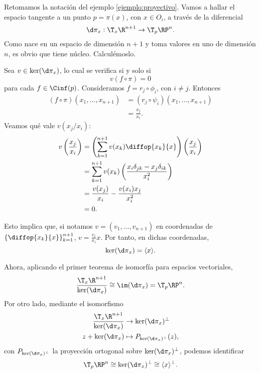 \begin{ejemplo}
  Retomamos la notación del ejemplo \ref{ejemplo:proyectivo}. Vamos a hallar el
  espacio tangente a un punto $p=\pi(x)$, con $x\in O_{i}$, a través de la
  diferencial
  \[
      \d\pi_{x}: \T_{x}\R^{n+1}  \to \T_{p}\RP^{n}.
  \]
  Como nace en un espacio de dimensión $n+1$ y toma valores en uno de dimensión
  $n$, es obvio que tiene núcleo. Calculémoslo.

  Sea $v\in\ker(\d\pi_{x})$, lo cual se verifica si y solo si
  \[
    v(f\circ\pi) = 0
  \]
  para cada $f\in\Cinf(p)$. Consideramos $f = r_{j}\circ \phi_{i}$, con $i\ne
  j$. Entonces
  \begin{align*}
    (f \circ\pi)(x_{1}, \dots, x_{n+1}) & =
                                          (r_{j}\circ\psi_{i})(x_{1},\dots,x_{n+1})
    \\
    & = \frac{x_{j}}{x_{i}}.
  \end{align*}
  Veamos qué vale $v(x_{j}/x_{i})$:
  \begin{align*}
    v \left( \frac{x_{j}}{x_{i}} \right) & = \left( \sum_{k=1}^{n+1} v(x_{k})
                                           \diffop{x_{k}}{x} \right)\left(
                                           \frac{x_{j}}{x_{i}} \right) \\
    & = \sum_{k=1}^{n+1} v(x_{k}) \left( \frac{x_{i}\delta_{jk} -
      x_{j}\delta_{ik}}{x_{i}^{2}} \right) \\
                                         & = \frac{v(x_{j})}{x_{i}} -
                                           \frac{v(x_{i})x_{j}}{x_{i}^{2}} \\
                                           & = 0.
  \end{align*}

  Esto implica que, si notamos $v = (v_{1}, \dots, v_{n+1})$ en coordenadas de
  $\left\{ \diffop{x_{k}}{x} \right\}_{k=1}^{n+1}$, $v =
  \frac{v_{i}}{x_{i}}x$. Por tanto, en dichas coordenadas,
  \[
    \ker(\d\pi_{x}) = \langle x  \rangle 
    .\]

  Ahora, aplicando el primer teorema de isomorfía para espacios vectoriales,
  \[
    \frac{\T_{x}\R^{n+1}}{\ker(\d\pi_{x})} \cong \im(\d\pi_{x}) = \T_{p}\RP^{n}
    .\]
  Por otro lado, mediante el isomorfismo
  \begin{alignat*}{2}
       \frac{\T_{x}\R^{n+1}}{\ker(\d\pi_{x})} &\to \ker(\d\pi_{x})^{\perp} \\
    z + \ker(\d\pi_{x}) & \mapsto P_{\ker(\d\pi_{x})^{\perp}}(z),
  \end{alignat*}
  con $P_{\ker(\d\pi_{x})^{\perp}}$ la proyección ortogonal sobre
  $\ker(\d\pi_{x})^{\perp}$, podemos identificar
  \[
    \T_{p}\RP^{n} \cong \ker(\d\pi_{x})^{\perp} \cong \langle x  \rangle^{\perp}
  .\]
\end{ejemplo}

